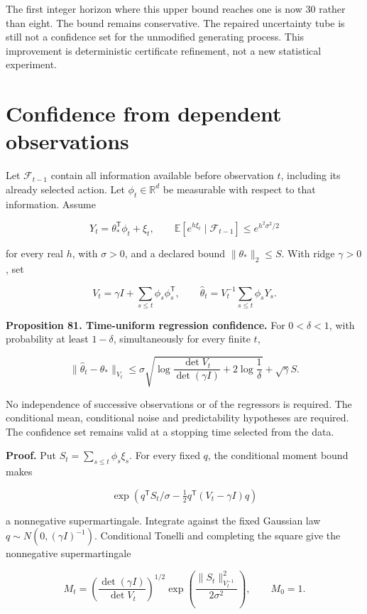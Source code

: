 The first integer horizon where this upper bound reaches one is now 30
rather than eight. The bound remains conservative. The repaired
uncertainty tube is still not a confidence set for the unmodified
generating process. This improvement is deterministic certificate
refinement, not a new statistical experiment.

\section{Confidence from dependent observations}\label{LSM:confidence-from-dependent-observations}

Let \(\mathcal F_{t-1}\) contain all information available before
observation \(t\), including its already selected action. Let
\(\phi_t\in\mathbb R^d\) be measurable with respect to that information.
Assume

\[
Y_t=\theta_*^{\mathsf T}\phi_t+\xi_t,
\qquad
\mathbb E[e^{h\xi_t}\mid\mathcal F_{t-1}]
\leq e^{h^2\sigma^2/2}
\]

for every real \(h\), with \(\sigma>0\), and a declared bound
\(\|\theta_*\|_2\leq S\). With ridge \(\gamma>0\), set

\[
V_t=\gamma I+\sum_{s\leq t}\phi_s\phi_s^{\mathsf T},
\qquad
\widehat\theta_t=V_t^{-1}\sum_{s\leq t}\phi_sY_s.
\]

\textbf{Proposition 81. Time-uniform regression confidence.} For
\(0<\delta<1\), with probability at least \(1-\delta\), simultaneously
for every finite \(t\),

\[
\boxed{
\|\widehat\theta_t-\theta_*\|_{V_t}
\leq
\sigma\sqrt{
\log\frac{\det V_t}{\det(\gamma I)}+2\log\frac1\delta
}
+\sqrt\gamma S.
}
\]

No independence of successive observations or of the regressors is
required. The conditional mean, conditional noise and predictability
hypotheses are required. The confidence set remains valid at a stopping
time selected from the data.

\textbf{Proof.} Put \(S_t=\sum_{s\leq t}\phi_s\xi_s\). For every fixed
\(q\), the conditional moment bound makes

\[
\exp\left(q^{\mathsf T}S_t/\sigma
-\tfrac12q^{\mathsf T}(V_t-\gamma I)q\right)
\]

a nonnegative supermartingale. Integrate against the fixed Gaussian law
\(q\sim N(0,(\gamma I)^{-1})\). Conditional Tonelli and completing the
square give the nonnegative supermartingale

\[
M_t=
\left(\frac{\det(\gamma I)}{\det V_t}\right)^{1/2}
\exp\left(\frac{\|S_t\|_{V_t^{-1}}^2}{2\sigma^2}\right),
\qquad M_0=1.
\]

